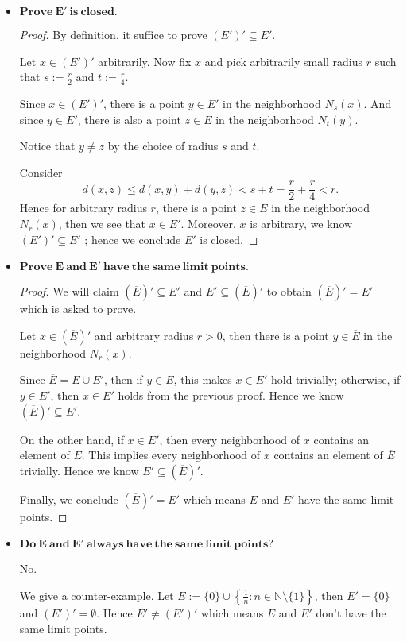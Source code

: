 \begin{Exercise}
\begin{itemize}
\item $\mathbf{Prove\ E'\ is\ closed.}$
\begin{proof}
By definition, it suffice to prove $(E')' \subseteq E'$. 

Let $x\in (E')'$ arbitrarily. Now fix $x$ and pick arbitrarily small radius $r$ such that $s := \frac{r}{2}$ and $t := \frac{r}{4}$.

Since $x\in (E')'$, there is a point $y\in E'$ in the neighborhood $N_s(x)$. And since $y\in E'$, there is also a point $z\in E$ in the neighborhood $N_t(y)$. 

Notice that $y\neq z$ by the choice of radius $s$ and $t$.

Consider
$$
d(x,z)
\leq d(x,y) + d(y,z)
< s + t
= \frac{r}{2} + \frac{r}{4}
< r.
$$
Hence for arbitrary radius $r$, there is a point $z\in E$ in the neighborhood $N_r(x)$, then we see that $x\in E'$. Moreover, $x$ is arbitrary, we know $(E')' \subseteq E'$ ; hence we conclude $E'$ is closed.
\end{proof}

\item $\mathbf{Prove\ E\ and\ E'\ have\ the\ same\ limit\ points.}$

\begin{proof}
We will claim $(\overline{E})' \subseteq E'$ and $E' \subseteq (\overline{E})'$ to obtain $(\overline{E})' = E'$ which is asked to prove.

Let $x\in (\overline{E})'$ and arbitrary radius $r > 0$, then there is a point $y\in \overline{E}$ in the neighborhood $N_r(x)$.

Since $\overline{E} = E\cup E'$, then if $y\in E$, this makes $x\in E'$ hold trivially; otherwise, if $y\in E'$, then $x\in E'$ holds from the previous proof. Hence we know $(\overline{E})' \subseteq E'$.

On the other hand, if $x\in E'$, then every neighborhood of $x$ contains an element of $E$. This implies every neighborhood of $x$ contains an element of $\overline{E}$ trivially. Hence we know $E' \subseteq (\overline{E})'$.

Finally, we conclude $(\overline{E})' = E'$ which means $E$ and $E'$ have the same limit points.
\end{proof}

\item $\mathbf{Do\ E\ and\ E'\ always\ have\ the\ same\ limit\ points?}$
\begin{solution}
No.

We give a counter-example.
Let $E := \{0\} \cup \left\{ \frac{1}{n}:n\in\mathbb{N}\setminus\{1\} \right\}$, then $E' = \{0\}$ and $(E')' = \emptyset$. Hence $E' \neq (E')'$ which means $E$ and $E'$ don't have the same limit points.
\end{solution}
\end{itemize}
\end{Exercise}
